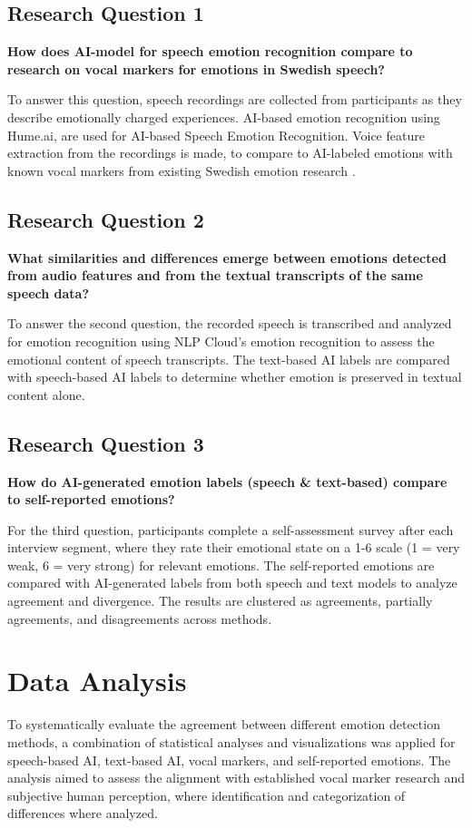 \subsection{Research Question 1}
\textbf{How does AI-model for speech emotion recognition compare to research on vocal markers for emotions in Swedish speech?}

To answer this question, speech recordings are collected from participants as they describe emotionally charged experiences. AI-based emotion recognition using Hume.ai, are used for AI-based Speech Emotion Recognition. Voice feature extraction from the recordings is made, to compare to AI-labeled emotions with known vocal markers from existing Swedish emotion research \autocite{Ekberg2023}. 

\subsection{Research Question 2}
\textbf{What similarities and differences emerge between emotions detected from audio features and from the textual transcripts of the same speech data?}

To answer the second question, the recorded speech is transcribed and analyzed for emotion recognition using NLP Cloud’s emotion recognition to assess the emotional content of speech transcripts. The text-based AI labels are compared with speech-based AI labels to determine whether emotion is preserved in textual content alone. 

\subsection{Research Question 3}
\textbf{How do AI-generated emotion labels (speech \& text-based) compare to self-reported emotions? }

For the third question, participants complete a self-assessment survey after each interview segment, where they rate their emotional state on a 1-6 scale (1 = very weak, 6 = very strong) for relevant emotions. The self-reported emotions are compared with AI-generated labels from both speech and text models to analyze agreement and divergence. The results are clustered as agreements, partially agreements, and disagreements across methods. 


\section{Data Analysis}
\label{sec:method-data-analysis}
To systematically evaluate the agreement between different emotion detection methods, a combination of statistical analyses and visualizations was applied for speech-based AI, text-based AI, vocal markers, and self-reported emotions. 
The analysis aimed to assess the alignment with established vocal marker research and subjective human perception, where identification and categorization of differences where analyzed. 

